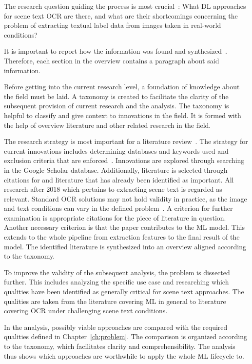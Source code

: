 The research question guiding the process is most crucial~\citep{snyder_literature_2019}:
What \ac{DL} approaches for scene text \ac{OCR} are there, and what are their shortcomings concerning
the problem of extracting textual label data from images taken in real-world conditions?

It is important to report how the information was found and
synthesized~\citep{torraco_writing_2005}.
Therefore, each section in the overview contains a paragraph about said information.

Before getting into the current research level, a foundation of knowledge about the field must be
laid.
A taxonomy is created to facilitate the clarity of the subsequent provision of current research and
the analysis.
The taxonomy is helpful to classify and give context to innovations in the field.
It is formed with the help of overview literature and other related research in the field.

The research strategy is most important for a literature
review~\citep{snyder_literature_2019}.
The strategy for current innovations includes determining databases and keywords
used and exclusion criteria that are enforced~\citep{torraco_writing_2005}.
Innovations are explored through searching in the Google Scholar database.
Additionally, literature is selected through citations for and literature that has already been
identified as important.
All research after 2018 which pertains to extracting scene text is regarded as relevant.
Standard \ac{OCR} solutions may not hold validity in practice, as the image and text conditions can
vary in the defined problem~\citep{chen_text_2021}.
A criterion for further examination is appropriate citations for the piece of literature
in question.
Another necessary criterion is that the paper contributes to the \ac{ML} model.
This extends to the whole pipeline from extraction features to the final result of the model.
The identified literature is synthesized into an overview aligned according to the taxonomy.

To improve the validity of the subsequent analysis, the problem is dissected further.
This includes analyzing the specific use case and researching which qualities have been
identified as generally critical for scene text approaches.
The qualities are taken from the literature covering \ac{ML} in general to literature
covering \ac{OCR} under challenging scene text conditions.

In the analysis, possibly viable approaches are compared with the required qualities defined
in Chapter~\ref{ch:problem}.
The comparison is organized according to the taxonomy, which facilitates clarity and
comprehensibility.
The analysis thus shows which approaches are worthwhile to apply the whole \ac{ML} lifecycle to.

